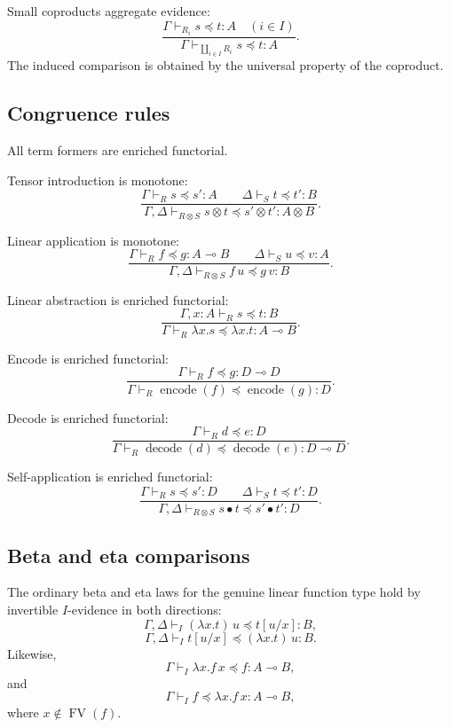 Small coproducts aggregate evidence:
\[
    \frac{\Gamma\vdash_{R_i} s\preceq t:A\quad(i\in I)}
         {\Gamma\vdash_{\coprod_{i\in I}R_i} s\preceq t:A}.
\]
The induced comparison is obtained by the universal property of the coproduct.

\subsection{Congruence rules}
\label{subsec:congruence-rules-cosmos}

All term formers are enriched functorial.

Tensor introduction is monotone:
\[
    \frac{\Gamma\vdash_R s\preceq s':A
          \qquad
          \Delta\vdash_S t\preceq t':B}
         {\Gamma,\Delta\vdash_{R\otimes S}
          s\otimes t\preceq s'\otimes t':A\otimes B}.
\]

Linear application is monotone:
\[
    \frac{\Gamma\vdash_R f\preceq g:A\multimap B
          \qquad
          \Delta\vdash_S u\preceq v:A}
         {\Gamma,\Delta\vdash_{R\otimes S}
          f\,u\preceq g\,v:B}.
\]

Linear abstraction is enriched functorial:
\[
    \frac{\Gamma,x:A\vdash_R s\preceq t:B}
         {\Gamma\vdash_R
          \lambda x.s\preceq \lambda x.t:A\multimap B}.
\]

Encode is enriched functorial:
\[
    \frac{\Gamma\vdash_R f\preceq g:D\multimap D}
         {\Gamma\vdash_R
          \operatorname{encode}(f)\preceq\operatorname{encode}(g):D}.
\]

Decode is enriched functorial:
\[
    \frac{\Gamma\vdash_R d\preceq e:D}
         {\Gamma\vdash_R
          \operatorname{decode}(d)\preceq\operatorname{decode}(e):D\multimap D}.
\]

Self-application is enriched functorial:
\[
    \frac{\Gamma\vdash_R s\preceq s':D
          \qquad
          \Delta\vdash_S t\preceq t':D}
         {\Gamma,\Delta\vdash_{R\otimes S}
          s\bullet t\preceq s'\bullet t':D}.
\]

\subsection{Beta and eta comparisons}
\label{subsec:beta-eta-comparisons-cosmos}

The ordinary beta and eta laws for the genuine linear function type hold by
invertible \(I\)-evidence in both directions:
\[
    \Gamma,\Delta
    \vdash_I
    (\lambda x.t)\,u
    \preceq
    t[u/x]
    :
    B,
\]
\[
    \Gamma,\Delta
    \vdash_I
    t[u/x]
    \preceq
    (\lambda x.t)\,u
    :
    B.
\]
Likewise,
\[
    \Gamma
    \vdash_I
    \lambda x.f\,x
    \preceq
    f
    :
    A\multimap B,
\]
and
\[
    \Gamma
    \vdash_I
    f
    \preceq
    \lambda x.f\,x
    :
    A\multimap B,
\]
where \(x\notin\operatorname{FV}(f)\).

